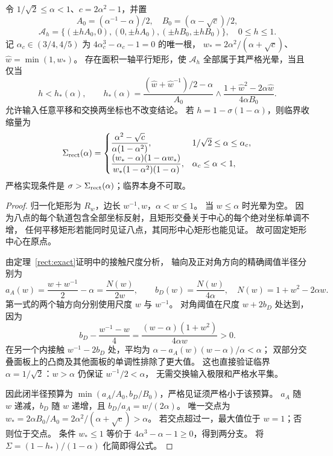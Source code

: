 \begin{theorem}[八点矩形模型的完整分支]\label{wr:eight-rectangle}
令 $1/\sqrt2\le\alpha<1$、$c=2\alpha^2-1$，并置
\[
 A_0=(\alpha^{-1}-\alpha)/2,\quad B_0=(\alpha-\sqrt c)/2,
\]
\[
 \mathscr A_h=\{(\pm hA_0,0),(0,\pm hA_0),(\pm hB_0,\pm hB_0)\},\quad0\le h\le1.
\]
记 $\alpha_c\in(3/4,4/5)$ 为 $4\alpha_c^3-\alpha_c-1=0$ 的唯一根，
$w_*=2\alpha^2/(\alpha+\sqrt c)$、$\widehat w=\min(1,w_*)$。
存在面积一轴平行矩形，使 $\mathscr A_h$ 全部属于其严格光晕，当且仅当
\[
 h<h_*(\alpha),\qquad
 h_*(\alpha)=\frac{(\widehat w+\widehat w^{-1})/2-\alpha}{A_0}
 \wedge\frac{1+\widehat w^2-2\alpha\widehat w}{4\alpha B_0}.
\]
允许输入任意平移和交换两坐标也不改变结论。
若 $h=1-\sigma(1-\alpha)$，则临界收缩量为
\[
 \Sigma_{\rm rect}(\alpha)=
 \begin{cases}
 \dfrac{\alpha^2-\sqrt c}{\alpha(1-\alpha^2)},&1/\sqrt2\le\alpha\le\alpha_c,\\[2mm]
 \dfrac{(w_*-\alpha)(1-\alpha w_*)}{w_*(1-\alpha^2)(1-\alpha)},&\alpha_c\le\alpha<1,
 \end{cases}
\]
严格实现条件是 $\sigma>\Sigma_{\rm rect}(\alpha)$；临界本身不可取。
\end{theorem}
\begin{proof}
归一化矩形为 $R_w$，边长 $w^{-1},w$，$\alpha<w\le1$。
当 $w\le\alpha$ 时光晕为空。
因为八点的每个轨道包含全部坐标反射，且矩形交叠关于中心的每个绝对坐标单调不增，
任何平移矩形若能同时见证八点，其同形中心矩形也能见证。
故可固定矩形中心在原点。

由定理~\ref{rect:exact}证明中的接触尺度分析，
轴向及正对角方向的精确阈值半径分别为
\[
 a_A(w)=\frac{w+w^{-1}}2-\alpha=\frac{N(w)}{2w},\qquad
 b_D(w)=\frac{N(w)}{4\alpha},\quad N(w)=1+w^2-2\alpha w.
\]
第一式的两个轴方向分别使用尺度 $w$ 与 $w^{-1}$。
对角阈值在尺度 $w+2b_D$ 处达到，因为
\[
 b_D-\frac{w^{-1}-w}{4}=\frac{(w-\alpha)(1+w^2)}{4\alpha w}>0.
\]
在另一个内接触 $w^{-1}-2b_D$ 处，平均为
$\alpha-a_A(w)(w-\alpha)/\alpha<\alpha$；
双部分交叠面板上的凸商及其他面板的单调性排除了更大值。
这也直接验证临界 $\alpha=1/\sqrt2$：$w>\alpha$ 仍保证 $w^{-1}/2<\alpha$，
无需交换输入极限和严格水平集。

因此闭半径预算为 $\min(a_A/A_0,b_D/B_0)$，严格见证须严格小于该预算。
$a_A$ 随 $w$ 递减，$b_D$ 随 $w$ 递增，且 $b_D/a_A=w/(2\alpha)$。
唯一交点为 $w_*=2\alpha B_0/A_0=2\alpha^2/(\alpha+\sqrt c)>\alpha$。
若交点超过一，最大值位于 $w=1$；否则位于交点。
条件 $w_*\le1$ 等价于 $4\alpha^3-\alpha-1\ge0$，得到两分支。
将 $\Sigma=(1-h_*)/(1-\alpha)$ 化简即得公式。
\end{proof}

